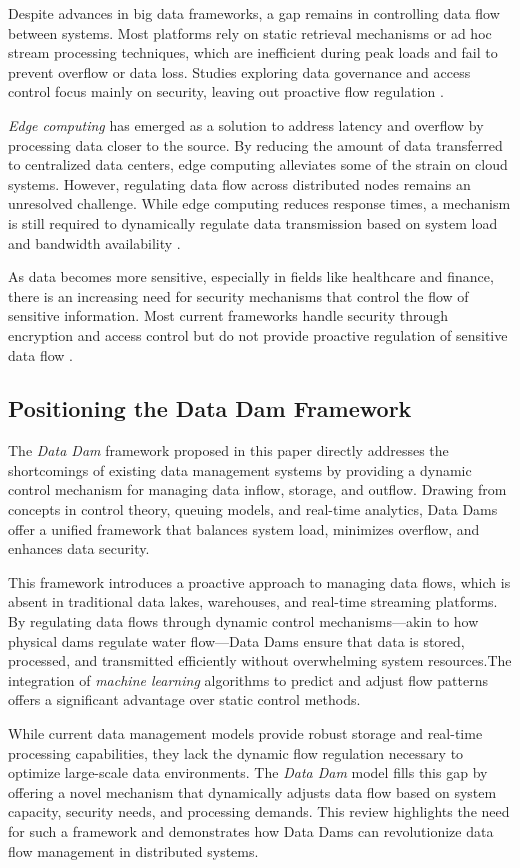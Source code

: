 Despite advances in big data frameworks, a gap remains in controlling data flow between systems. Most platforms rely on static retrieval mechanisms or ad hoc stream processing techniques, which are inefficient during peak loads and fail to prevent overflow or data loss. Studies exploring data governance and access control focus mainly on security, leaving out proactive flow regulation \cite{georgiadis2021enterprise}.

\textit{Edge computing} has emerged as a solution to address latency and overflow by processing data closer to the source. By reducing the amount of data transferred to centralized data centers, edge computing alleviates some of the strain on cloud systems. However, regulating data flow across distributed nodes remains an unresolved challenge. While edge computing reduces response times, a mechanism is still required to dynamically regulate data transmission based on system load and bandwidth availability \cite{ullah2018information}.


As data becomes more sensitive, especially in fields like healthcare and finance, there is an increasing need for security mechanisms that control the flow of sensitive information. Most current frameworks handle security through encryption and access control but do not provide proactive regulation of sensitive data flow \cite{yang2020data,raparthi2021privacy,josphineleela2023big}.

\subsection{Positioning the Data Dam Framework}

The \textit{Data Dam} framework proposed in this paper directly addresses the shortcomings of existing data management systems by providing a dynamic control mechanism for managing data inflow, storage, and outflow. Drawing from concepts in control theory, queuing models, and real-time analytics, Data Dams offer a unified framework that balances system load, minimizes overflow, and enhances data security.

This framework introduces a proactive approach to managing data flows, which is absent in traditional data lakes, warehouses, and real-time streaming platforms. By regulating data flows through dynamic control mechanisms—akin to how physical dams regulate water flow—Data Dams ensure that data is stored, processed, and transmitted efficiently without overwhelming system resources.The integration of \textit{machine learning} algorithms to predict and adjust flow patterns offers a significant advantage over static control methods.

While current data management models provide robust storage and real-time processing capabilities, they lack the dynamic flow regulation necessary to optimize large-scale data environments. The \textit{Data Dam} model fills this gap by offering a novel mechanism that dynamically adjusts data flow based on system capacity, security needs, and processing demands. This review highlights the need for such a framework and demonstrates how Data Dams can revolutionize data flow management in distributed systems.

